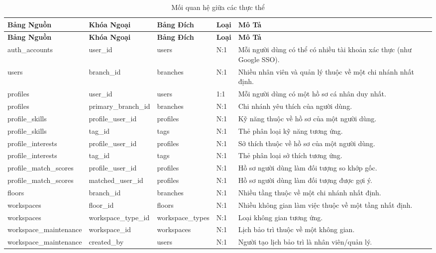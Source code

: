 \begin{longtable}{|p{3.2cm}|p{2.8cm}|p{2.8cm}|p{0.9cm}|p{3.6cm}|}
\caption{Mối quan hệ giữa các thực thể} \\
\hline
\textbf{Bảng Nguồn} & \textbf{Khóa Ngoại} & \textbf{Bảng Đích} & \textbf{Loại} & \textbf{Mô Tả} \\
\hline
\endfirsthead
\hline
\textbf{Bảng Nguồn} & \textbf{Khóa Ngoại} & \textbf{Bảng Đích} & \textbf{Loại} & \textbf{Mô Tả} \\
\hline
\endhead
auth\_accounts & user\_id & users & N:1 & Mỗi người dùng có thể có nhiều tài khoản xác thực (như Google SSO). \\
\hline
users & branch\_id & branches & N:1 & Nhiều nhân viên và quản lý thuộc về một chi nhánh nhất định. \\
\hline
profiles & user\_id & users & 1:1 & Mỗi người dùng có một hồ sơ cá nhân duy nhất. \\
\hline
profiles & primary\_branch\_id & branches & N:1 & Chi nhánh yêu thích của người dùng. \\
\hline
profile\_skills & profile\_user\_id & profiles & N:1 & Kỹ năng thuộc về hồ sơ của một người dùng. \\
\hline
profile\_skills & tag\_id & tags & N:1 & Thẻ phân loại kỹ năng tương ứng. \\
\hline
profile\_interests & profile\_user\_id & profiles & N:1 & Sở thích thuộc về hồ sơ của một người dùng. \\
\hline
profile\_interests & tag\_id & tags & N:1 & Thẻ phân loại sở thích tương ứng. \\
\hline
profile\_\allowbreak match\_\allowbreak scores & profile\_user\_id & profiles & N:1 & Hồ sơ người dùng làm đối tượng so khớp gốc. \\
\hline
profile\_\allowbreak match\_\allowbreak scores & matched\_user\_id & profiles & N:1 & Hồ sơ người dùng làm đối tượng được gợi ý. \\
\hline
floors & branch\_id & branches & N:1 & Nhiều tầng thuộc về một chi nhánh nhất định. \\
\hline
workspaces & floor\_id & floors & N:1 & Nhiều không gian làm việc thuộc về một tầng nhất định. \\
\hline
workspaces & workspace\_type\_id & workspace\_\allowbreak types & N:1 & Loại không gian tương ứng. \\
\hline
workspace\_\allowbreak maintenance & workspace\_id & workspaces & N:1 & Lịch bảo trì thuộc về một không gian. \\
\hline
workspace\_\allowbreak maintenance & created\_by & users & N:1 & Người tạo lịch bảo trì là nhân viên/quản lý. \\

\end{longtable}

